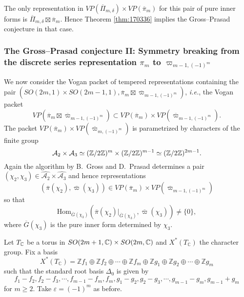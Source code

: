The only representation in $VP(\overline{\Pi}_{m,\delta} )\times VP(\overline{\pi}_m)$ for this pair of pure inner forms  is $\overline{\Pi}_{m,\delta} \boxtimes \overline{\pi}_m$.
Hence Theorem \ref{thm:170336} implies the Gross--Prasad conjecture
 in that case.



\subsubsection{The Gross--Prasad conjecture II: 
Symmetry breaking from the discrete series representation 
 $\pi_m$
 to $\varpi_{m-1,(-1)^m}$}



We now consider the Vogan packet of tempered representations containing the pair $(SO(2m,1) \times SO(2m-1,1), {\overline{\pi}}_{m} \boxtimes \overline{\varpi}_{m-1,(-1)^m} )$, 
 {\it{i.e.}}, 
 the Vogan packet 
\[
VP(\overline{\pi}_m\boxtimes \overline{\varpi}_{m-1,(-1)^m})\subset VP(\overline{\pi}_m) \times VP(\overline{\varpi}_{m-1,(-1)^m}).  
\] 
The packet $VP(\overline{\pi}_m) \times VP(\overline{\varpi }_{m,(-1)^m})$ is
 parametrized by  characters of the finite group  
\[
     {\mathcal{A}}_2 \times {\mathcal{A}}_3
 \simeq 
 ({\mathbb Z}/2{\mathbb Z})^m \times ({\mathbb Z}/2{\mathbb Z})^{m-1}\simeq ({\mathbb Z}/2{\mathbb Z})^{2m-1}.
\]
Again 
 the algorithm by B.~Gross and D.~Prasad  determines a pair 
 $(\chi_2,\chi_3) \in \widehat{{\mathcal{A}}_2} \times \widehat{{\mathcal{A}}_3}$
 and hence representations 
\[
 (\overline{\pi}(\chi_2), \overline{\varpi}(\chi_3 )) \in VP(\overline{\pi}_{m})\times VP(\overline{\varpi}_{m-1,(-1)^m}  )\] so that 
\[ 
     \mbox{Hom}_{\overline{G}(\chi_3)}(\overline{\pi}(\chi_2)|_{\overline{G}(\chi_3)},\overline{\varpi}(\chi_3) ) \not = \{0\}, 
\]
where $\overline{G}(\chi_3) $ is the pure inner form determined by $\chi_3$.

\medskip

 
Let $T_{\mathbb C}$ be a torus in $SO(2m+1,{\mathbb C})\times  SO(2m, {\mathbb C})$
 and $X^{\ast}(T_{\mathbb{C}})$ the character group.  
Fix a basis 
\[
  X^{\ast}(T_{\mathbb{C}})
  =
  {\mathbb{Z}}f_1 \oplus {\mathbb{Z}}f_2 \oplus \cdots
   \oplus {\mathbb{Z}}f_m
   \oplus {\mathbb{Z}}g_1 \oplus {\mathbb{Z}} g_2 \oplus
   \cdots
   \oplus {\mathbb{Z}} g_m 
\]
 such that the standard root basis
 $\Delta_0$ is given by 
\[
  f_1 - f_2, f_2 - f_3, \cdots, f_{m-1} - f_m, f_m,
  g_1-g_2, g_2-g_3, \cdots, g_{m-1}-g_m, g_{m-1}+g_m
\] 
for $m \ge 2$.  
Take $\varepsilon=(-1)^{m}$ as before.  



